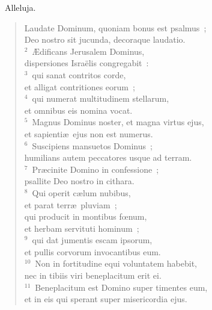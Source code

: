 ~\lettrine[lines=10,image=true,loversize=0.05,lraise=-0.03]{A}{}lleluja. \begin{flushleft}\begin{verse}\vspace{6pt}Laudate Dominum, quoniam bonus est psalmus~;\\ Deo nostro sit jucunda, decoraque laudatio.\\
${}^{2}$~\AE dificans Jerusalem Dominus,\\ dispersiones Isra\"elis congregabit~:\\
${}^{3}$~qui sanat contritos corde,\\ et alligat contritiones eorum~;\\
${}^{4}$~qui numerat multitudinem stellarum,\\ et omnibus eis nomina vocat.\\
${}^{5}$~Magnus Dominus noster, et magna virtus ejus,\\ et sapienti\ae\ ejus non est numerus.\\
${}^{6}$~Suscipiens mansuetos Dominus~;\\ humilians autem peccatores usque ad terram.\\
${}^{7}$~Pr\ae cinite Domino in confessione~;\\ psallite Deo nostro in cithara.\\
${}^{8}$~Qui operit c\ae lum nubibus,\\ et parat terr\ae\ pluviam~;\\ qui producit in montibus fœnum,\\ et herbam servituti hominum~;\\
${}^{9}$~qui dat jumentis escam ipsorum,\\ et pullis corvorum invocantibus eum.\\
${}^{10}$~Non in fortitudine equi voluntatem habebit,\\ nec in tibiis viri beneplacitum erit ei.\\
${}^{11}$~Beneplacitum est Domino super timentes eum,\\ et in eis qui sperant super misericordia ejus.\end{verse}\end{flushleft}


